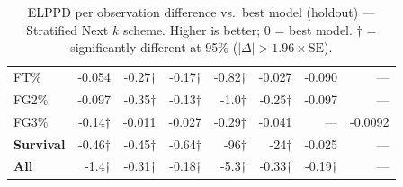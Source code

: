 \documentclass{article}
\begin{document}
\begin{table}[H]
{\begin{tabular}{lrrrrrrr}
FT\% & -0.054 & -0.27$\dagger$ & -0.17$\dagger$ & -0.82$\dagger$ & -0.027 & -0.090 & --- \\[2pt]
FG2\% & -0.097 & -0.35$\dagger$ & -0.13$\dagger$ & -1.0$\dagger$ & -0.25$\dagger$ & -0.097 & --- \\[2pt]
FG3\% & -0.14$\dagger$ & -0.011 & -0.027 & -0.29$\dagger$ & -0.041 & --- & -0.0092 \\[2pt]
\midrule
\textbf{Survival} & -0.46$\dagger$ & -0.45$\dagger$ & -0.64$\dagger$ & -96$\dagger$ & -24$\dagger$ & -0.025 & --- \\
\midrule
\textbf{All} & -1.4$\dagger$ & -0.31$\dagger$ & -0.18$\dagger$ & -5.3$\dagger$ & -0.33$\dagger$ & -0.19$\dagger$ & --- \\
\bottomrule
\end{tabular}
}
\caption{ELPPD per observation difference vs.\ best model (holdout) --- Stratified Next $k$ scheme. Higher is better; 0 = best model. $\dagger$ = significantly different at 95\% ($|\Delta|>1.96\times\mathrm{SE}$).}
\label{tab:elppd_stratified_next_k}
\end{table}
\end{document}
